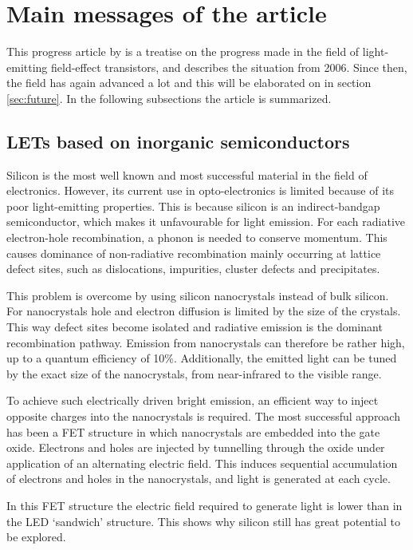 \section{Main messages of the article}

This progress article by \citet{Muccini} is a treatise on the progress made in the field of light-emitting field-effect transistors, and describes the situation from 2006. Since then, the field has again advanced a lot and this will be elaborated on in section \ref{sec:future}. In the following subsections the article is summarized.

\subsection{LETs based on inorganic semiconductors} %

Silicon is the most well known and most successful material in the field of electronics. However, its current use in opto-electronics is limited because of its poor light-emitting properties. This is because silicon is an indirect-bandgap semiconductor, which makes it unfavourable for light emission. For each radiative electron-hole recombination, a phonon is needed to conserve momentum. This causes dominance of non-radiative recombination mainly occurring at lattice defect sites, such as dislocations, impurities, cluster defects and precipitates.

This problem is overcome by using silicon nanocrystals instead of bulk silicon. For nanocrystals hole and electron diffusion is limited by the size of the crystals. This way defect sites become isolated and radiative emission is the dominant recombination pathway. Emission from nanocrystals can therefore be rather high, up to a quantum efficiency of  10\%. Additionally, the emitted light can be tuned by the exact size of the nanocrystals, from near-infrared to the visible range. 

To achieve such electrically driven bright emission, an efficient way to inject opposite charges into the nanocrystals is required. The most successful approach has been a FET structure in which nanocrystals are embedded into the gate oxide. Electrons and holes are injected by tunnelling through the oxide under application of an alternating electric field. This induces sequential accumulation of electrons and holes in the nanocrystals, and light is generated at each cycle.

In this FET structure the electric field required to generate light is lower than in the LED `sandwich' structure. This shows why silicon still has great potential to be explored.

